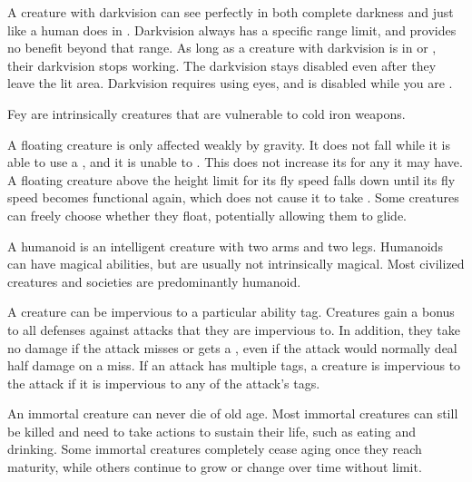   A creature with darkvision can see perfectly in both complete darkness and  just like a human does in .
  Darkvision always has a specific range limit, and provides no benefit beyond that range.
  As long as a creature with darkvision is in  or , their darkvision stops working.
  The darkvision  stays disabled even after they leave the lit area.
  Darkvision requires using eyes, and is disabled while you are \dazzled.

  Fey are intrinsically \magical creatures that are vulnerable to cold iron weapons.

  A floating creature is only affected weakly by gravity.
  It does not fall while it is able to use a , and it is unable to .
  This does not increase its  for any  it may have.
  A floating creature above the height limit for its fly speed falls down until its fly speed becomes functional again, which does not cause it to take .
  Some creatures can freely choose whether they float, potentially allowing them to glide.

  A humanoid is an intelligent creature with two arms and two legs.
  Humanoids can have magical abilities, but are usually not intrinsically magical.
  Most civilized creatures and societies are predominantly humanoid.

  A creature can be impervious to a particular ability tag.
  Creatures gain a  bonus to all defenses against attacks that they are impervious to.
  In addition, they take no damage if the attack misses or gets a , even if the attack would normally deal half damage on a miss.
  If an attack has multiple tags, a creature is impervious to the attack if it is impervious to any of the attack's tags.

  An immortal creature can never die of old age.
  Most immortal creatures can still be killed and need to take actions to sustain their life, such as eating and drinking.
  Some immortal creatures completely cease aging once they reach maturity, while others continue to grow or change over time without limit.


